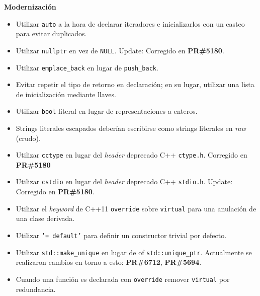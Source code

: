 \textbf{Modernización}
\begin{itemize}
  \item Utilizar \texttt{auto} a la hora de declarar iteradores e inicializarlos con un casteo para evitar duplicados.
  \item Utilizar \texttt{nullptr} en vez de \texttt{NULL}. Update: Corregido en \textbf{PR\#5180}\cite{GHPR5180}.
  \item Utilizar \texttt{emplace\_back} en lugar de \texttt{push\_back}.
  \item Evitar repetir el tipo de retorno en declaración; en su lugar, utilizar una lista de inicialización mediante llaves.
  \item Utilizar \texttt{bool} literal en lugar de representaciones a enteros.
  \item Strings literales escapados deberían escribirse como strings literales en \textit{raw} (crudo).
  \item Utilizar \texttt{cctype} en lugar del \textit{header} deprecado C++ \texttt{ctype.h}. Corregido en \textbf{PR\#5180}\cite{GHPR5180}
  \item Utilizar \texttt{cstdio} en lugar del \textit{header} deprecado C++ \texttt{stdio.h}. Update: Corregido en \textbf{PR\#5180}\cite{GHPR5180}.
  \item Utilizar el \textit{keyword} de C++11 \texttt{override} sobre \texttt{virtual} para una anulación de una clase derivada.
  \item Utilizar \texttt{'= default'} para definir un constructor trivial por defecto.
  \item Utilizar \texttt{std::make\_unique} en lugar de of \texttt{std::unique\_ptr}. Actualmente se realizaron cambios en torno a esto: \textbf{PR\#6712}\cite{GHPR6712}, \textbf{PR\#5694}\cite{GHPR5694}.
  \item Cuando una función es declarada con \texttt{override} remover \texttt{virtual} por redundancia.\\
\end{itemize}

